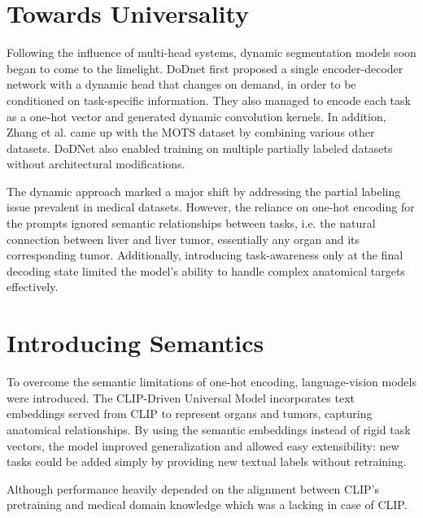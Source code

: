 \documentclass{cls/iutbscthesis}
\begin{document}
\section{Towards Universality}
Following the influence of multi-head systems, dynamic segmentation models soon began to come to the limelight. DoDnet \cite{zhang2021dodnet} first proposed a single encoder-decoder network with a dynamic head that changes on demand, in order to be conditioned on task-specific information. They also managed to encode each task as a one-hot vector and generated dynamic convolution kernels. In addition, Zhang et al. came up with the MOTS dataset by combining various other datasets. DoDNet also enabled training on multiple partially labeled datasets without architectural modifications.
\par
The dynamic approach marked a major shift by addressing the partial labeling issue prevalent in medical datasets. However, the reliance on one-hot encoding for the prompts ignored semantic relationships between tasks, i.e. the natural connection between liver and liver tumor, essentially any organ and its corresponding tumor. Additionally, introducing task-awareness only at the final decoding state limited the model's ability to handle complex anatomical targets effectively.

\section{Introducing Semantics}
To overcome the semantic limitations of one-hot encoding, language-vision models were introduced. The CLIP-Driven Universal Model \cite{liu2023clip} incorporates text embeddings served from CLIP to represent organs and tumors, capturing anatomical relationships. By using the semantic embeddings instead of rigid task vectors, the model improved generalization and allowed easy extensibility: new tasks could be added simply by providing new textual labels without retraining.
\par
Although performance heavily depended on the alignment between CLIP's pretraining and medical domain knowledge which was a lacking in case of CLIP.
\end{document}
